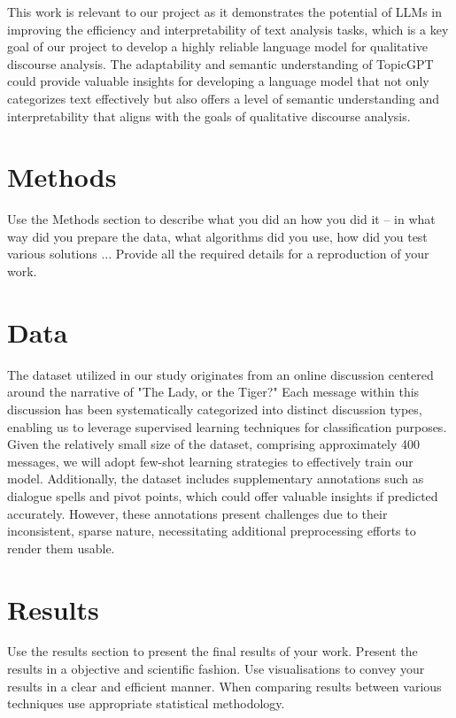 \documentclass[fleqn,moreauthors,10pt]{ds_report}
\begin{document}
This work is relevant to our project as it demonstrates the potential of LLMs in improving the efficiency and interpretability of text analysis tasks, which is a key goal of our project to develop a highly reliable language model for qualitative discourse analysis. The adaptability and semantic understanding of TopicGPT could provide valuable insights for developing a language model that not only categorizes text effectively but also offers a level of semantic understanding and interpretability that aligns with the goals of qualitative discourse analysis.



\section*{Methods}

Use the Methods section to describe what you did an how you did it -- in what way did you prepare the data, what algorithms did you use, how did you test various solutions ... Provide all the required details for a reproduction of your work.

\section*{Data}

The dataset utilized in our study originates from an online discussion centered around the narrative of "The Lady, or the Tiger?" Each message within this discussion has been systematically categorized into distinct discussion types, enabling us to leverage supervised learning techniques for classification purposes. Given the relatively small size of the dataset, comprising approximately 400 messages, we will adopt few-shot learning strategies to effectively train our model. Additionally, the dataset includes supplementary annotations such as dialogue spells and pivot points, which could offer valuable insights if predicted accurately. However, these annotations present challenges due to their inconsistent, sparse nature, necessitating additional preprocessing efforts to render them usable.

\section*{Results}

Use the results section to present the final results of your work. Present the results in a objective and scientific fashion. Use visualisations to convey your results in a clear and efficient manner. When comparing results between various techniques use appropriate statistical methodology.
\end{document}
